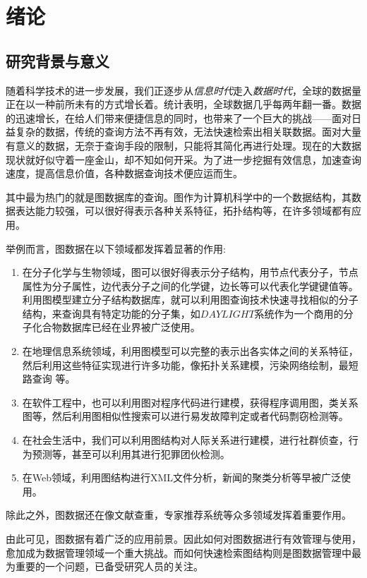 \documentclass{XDBAthesis}
\begin{document}
\else
\fi
\chapter{绪论}
\label{chap:introduction}
\section{研究背景与意义}
随着科学技术的进一步发展，我们正逐步从\emph{信息时代}走入\emph{数据时代}\cite{BigData}，全球的数据量正在以一种前所未有的方式增长着。统计表明，全球数据几乎每两年翻一番\cite{dataincrease}。数据的迅速增长，在给人们带来便捷信息的同时，也带来了一个巨大的挑战——面对日益复杂的数据，传统的查询方法不再有效，无法快速检索出相关联数据。面对大量有意义的数据，无奈于查询手段的限制，只能将其简化再进行处理。现在的大数据现状就好似守着一座金山，却不知如何开采。为了进一步挖掘有效信息，加速查询速度，提高信息价值，各种数据查询技术便应运而生。

其中最为热门的就是图数据库的查询。图作为计算机科学中的一个数据结构，其数据表达能力较强，可以很好得表示各种关系特征，拓扑结构等，在许多领域都有应用。

举例而言，图数据在以下领域都发挥着显著的作用:
\begin{enumerate}
    \item 在分子化学\cite{yp}与生物\cite{yy}领域，图可以很好得表示分子结构，用节点代表分子，节点属性为分子属性，边代表分子之间的化学键，边长等可以代表化学键键值等。利用图模型建立分子结构数据库，就可以利用图查询技术快速寻找相似的分子结构，来查询具有特定功能的分子集，如$DAYLIGHT$系统\cite{daylight}作为一个商用的分子化合物数据库已经在业界被广泛使用。
    \item 在地理信息系统领域\cite{y6,y7,y8}，利用图模型可以完整的表示出各实体之间的关系特征，然后利用这些特征实现进行许多功能，像拓扑关系建模，污染网络绘制，最短路查询\cite{y8} 等。
    \item 在软件工程中，也可以利用图对程序代码进行建模，获得程序调用图，类关系图等，然后利用图相似性搜索可以进行易发故障判定或者代码剽窃检测\cite{copy}等。
    \item 在社会生活中，我们可以利用图结构对人际关系进行建模，进行社群侦查，行为预测等，甚至可以利用其进行犯罪团伙检测\cite{y10}。
    \item 在Web领域，利用图结构进行XML文件分析，新闻的聚类分析等早被广泛使用。
\end{enumerate}

除此之外，图数据还在像文献查重\cite{y9}，专家推荐系统等众多领域发挥着重要作用。

由此可见，图数据有着广泛的应用前景。因此如何对图数据进行有效管理与使用，愈加成为数据管理领域一个重大挑战。而如何快速检索图结构则是图数据管理中最为重要的一个问题，已备受研究人员的关注。
\end{document}
